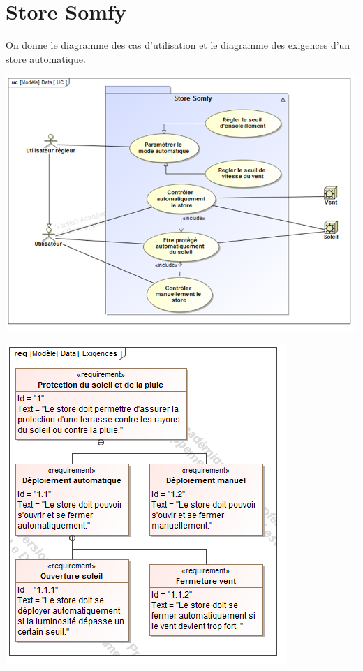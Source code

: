 \documentclass[10pt]{article}
\newif\ifprof
\begin{document}





\section{Store Somfy}
 \ifprof
 \else
\begin{minipage}[c]{.48\linewidth}
On donne le diagramme des cas d’utilisation et le diagramme des exigences d’un store automatique.
\begin{center}
\includegraphics[width=.95\textwidth]{images/uc}
\end{center}
\end{minipage} \hfill
\begin{minipage}[c]{.45\linewidth}
\begin{center}
\includegraphics[width=.85\textwidth]{images/req}
\end{center}
\end{minipage} 
\fi
\end{document}
